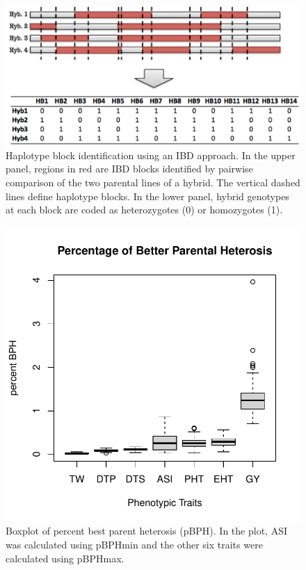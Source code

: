 \documentclass[9pt,twocolumn,twoside]{gsajnl}
\begin{document}
\begin{figure}[htbp]
\centering
\includegraphics[width=\linewidth]{SFig_define_IBD.pdf}
\caption{Haplotype block identification using an IBD approach. In the upper panel, regions in red are IBD blocks identified by pairwise comparison of the two parental lines of a hybrid. The vertical dashed lines define haplotype blocks. In the lower panel, hybrid genotypes at each block are coded as heterozygotes (0) or homozygotes (1).}
\label{fig:defineibd}
\end{figure}



\begin{figure}[htbp]
\centering
\includegraphics[width=\linewidth]{SFig_pBPH.pdf}
\caption{Boxplot of percent best parent heterosis (pBPH). In the plot, ASI was calculated using pBPHmin and the other six traits were calculated using pBPHmax.}
\label{fig:pBPH}
\end{figure}
\end{document}

